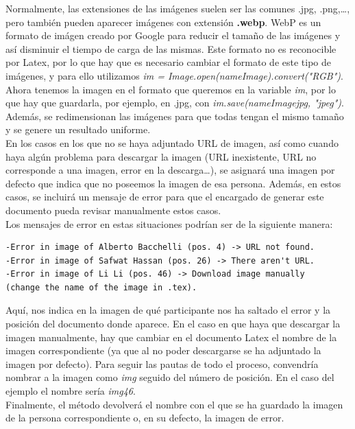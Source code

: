 \documentclass[a4paper, 12pt]{book}
\begin{document}
Normalmente, las extensiones de las imágenes suelen ser las comunes .jpg, .png,\ldots, pero también pueden aparecer imágenes con extensión \textbf{.webp}. WebP es un formato de imágen creado por Google para reducir el tamaño de las imágenes y así disminuir el tiempo de carga de las mismas. Este formato no es reconocible por Latex, por lo que hay que es necesario cambiar el formato de este tipo de imágenes, y para ello utilizamos \textit{im = Image.open(nameImage).convert("RGB")}. Ahora tenemos la imagen en el formato que queremos en la variable \textit{im}, por lo que hay que guardarla, por ejemplo, en .jpg, con \textit{im.save(nameImagejpg, "jpeg")}.\\

Además, se redimensionan las imágenes para que todas tengan el mismo tamaño y se genere un resultado uniforme.\\

En los casos en los que no se haya adjuntado URL de imagen, así como cuando haya algún problema para descargar la imagen (URL inexistente, URL no corresponde a una imagen, error en la descarga\ldots), se asignará una imagen por defecto que indica que no poseemos la imagen de esa persona. Además, en estos casos, se incluirá un mensaje de error para que el encargado de generar este documento pueda revisar manualmente estos casos.\\

Los mensajes de error en estas situaciones podrían ser de la siguiente manera:
\begin{verbatim}
-Error in image of Alberto Bacchelli (pos. 4) -> URL not found.
-Error in image of Safwat Hassan (pos. 26) -> There aren't URL.
-Error in image of Li Li (pos. 46) -> Download image manually
(change the name of the image in .tex).
\end{verbatim}
Aquí, nos indica en la imagen de qué participante nos ha saltado el error y la posición del documento donde aparece. En el caso en que haya que descargar la imagen manualmente, hay que cambiar en el documento Latex el nombre de la imagen correspondiente (ya que al no poder descargarse se ha adjuntado la imagen por defecto). Para seguir las pautas de todo el proceso, convendría nombrar a la imagen como \textit{img} seguido del número de posición. En el caso del ejemplo el nombre sería \textit{img46}.\\

Finalmente, el método devolverá el nombre con el que se ha guardado la imagen de la persona correspondiente o, en su defecto, la imagen de error.
\end{document}
